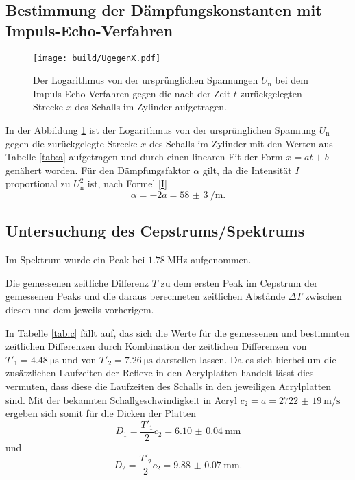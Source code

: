 \subsection{Bestimmung der Dämpfungskonstanten mit Impuls-Echo-Verfahren}
\begin{figure}
	\centering
	\caption{Der Logarithmus von der ursprünglichen Spannungen $U_\text{n}$ bei dem Impuls-Echo-Verfahren gegen die nach der Zeit $t$ zurückgelegten Strecke $x$ des Schalls im Zylinder aufgetragen.}
	\texttt{[image: build/UgegenX.pdf]}
	\label{fig:UgegenX}
\end{figure}
In der Abbildung \ref{fig:UgegenX} ist der Logarithmus von der ursprünglichen Spannung $U_\text{n}$ gegen die zurückgelegte Strecke $x$ des Schalls im Zylinder mit den Werten aus Tabelle \ref{tab:a} aufgetragen und durch einen linearen Fit der Form $x=a t + b$ genähert worden. Für den Dämpfungsfaktor $\alpha$ gilt, da die Intensität $I$ proportional zu $U_\text{n}^2$ ist, nach Formel \eqref{I}
\begin{equation}
	\alpha=-2 a = \SI{58(3)}{\per\meter}\text{.}
\end{equation}



\subsection{Untersuchung des Cepstrums/Spektrums}
Im Spektrum wurde ein Peak bei $\SI{1.78}{\mega\hertz}$ aufgenommen.
\begin{table}
	\centering
	\caption{Die gemessenen zeitliche Differenz $T$ zu dem ersten Peak im Cepstrum der gemessenen Peaks und die daraus berechneten zeitlichen Abstände $\Delta T$ zwischen diesen und dem jeweils vorherigem.}
	
\end{table}
In Tabelle \ref{tab:c} fällt auf, das sich die Werte für die gemessenen und bestimmten zeitlichen Differenzen durch Kombination der zeitlichen Differenzen von $T'_1=\SI{4.48}{\micro\second}$ und von $T'_2=\SI{7.26}{\micro\second}$ darstellen lassen. Da es sich hierbei um die zusätzlichen Laufzeiten der Reflexe in den Acrylplatten handelt lässt dies vermuten, dass diese die Laufzeiten des Schalls in den jeweiligen Acrylplatten sind.
Mit der bekannten Schallgeschwindigkeit in Acryl $c_2=a=\SI{2722(19)}{\meter\per\second}$ ergeben sich somit für die Dicken der Platten
\begin{equation}
D_1=\frac{T'_1}{2} c_2=\SI{6.10(4)}{\milli\meter}
\end{equation}
und
\begin{equation}
D_2=\frac{T'_2}{2} c_2=\SI{9.88(7)}{\milli\meter}\text{.}
\end{equation}


